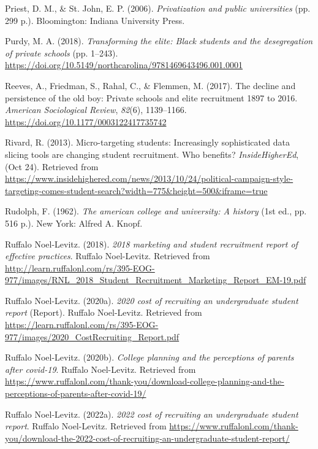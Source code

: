\documentclass[
  12pt,
]{article}
\newlength{\cslhangindent}
\newlength{\cslentryspacingunit} %
\newenvironment{CSLReferences}[2] %
 {%
  \setlength{\parindent}{0pt}
  \ifodd #1
  \let\oldpar\par
  \def\par{\hangindent=\cslhangindent\oldpar}
  \fi
  \setlength{\parskip}{#2\cslentryspacingunit}
 }%
 {}
\begin{document}
\begin{CSLReferences}{1}{0}
\leavevmode{}%
Priest, D. M., \& St. John, E. P. (2006). \emph{Privatization and public universities} (pp. 299 p.). Bloomington: Indiana University Press.

\leavevmode{}%
Purdy, M. A. (2018). \emph{Transforming the elite: Black students and the desegregation of private schools} (pp. 1--243). \url{https://doi.org/10.5149/northcarolina/9781469643496.001.0001}

\leavevmode{}%
Reeves, A., Friedman, S., Rahal, C., \& Flemmen, M. (2017). The decline and persistence of the old boy: Private schools and elite recruitment 1897 to 2016. \emph{American Sociological Review}, \emph{82}(6), 1139--1166. \url{https://doi.org/10.1177/0003122417735742}

\leavevmode{}%
Rivard, R. (2013). Micro-targeting students: Increasingly sophisticated data slicing tools are changing student recruitment. Who benefits? \emph{InsideHigherEd}, (Oct 24). Retrieved from \url{https://www.insidehighered.com/news/2013/10/24/political-campaign-style-targeting-comes-student-search?width=775\&height=500\&iframe=true}

\leavevmode{}%
Rudolph, F. (1962). \emph{The american college and university: A history} (1st ed., pp. 516 p.). New York: Alfred A. Knopf.

\leavevmode{}%
Ruffalo Noel-Levitz. (2018). \emph{2018 marketing and student recruitment report of effective practices}. Ruffalo Noel-Levitz. Retrieved from \url{http://learn.ruffalonl.com/rs/395-EOG-977/images/RNL_2018_Student_Recruitment_Marketing_Report_EM-19.pdf}

\leavevmode{}%
Ruffalo Noel-Levitz. (2020a). \emph{2020 cost of recruiting an undergraduate student report} (Report). Ruffalo Noel-Levitz. Retrieved from \url{https://learn.ruffalonl.com/rs/395-EOG-977/images/2020_CostRecruiting_Report.pdf}

\leavevmode{}%
Ruffalo Noel-Levitz. (2020b). \emph{College planning and the perceptions of parents after covid-19}. Ruffalo Noel-Levitz. Retrieved from \url{https://www.ruffalonl.com/thank-you/download-college-planning-and-the-perceptions-of-parents-after-covid-19/}

\leavevmode{}%
Ruffalo Noel-Levitz. (2022a). \emph{2022 cost of recruiting an undergraduate student report}. Ruffalo Noel-Levitz. Retrieved from \url{https://www.ruffalonl.com/thank-you/download-the-2022-cost-of-recruiting-an-undergraduate-student-report/}


\end{CSLReferences}
\end{document}

